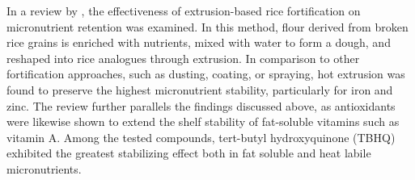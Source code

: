 In a review by \citet{saha}, the effectiveness of extrusion-based rice fortification on
 micronutrient retention was examined. In this method, flour derived from broken rice grains is
 enriched with nutrients, mixed with water to form a dough, and reshaped into rice analogues
 through extrusion. In comparison to other fortification approaches, such as dusting, coating, or 
 spraying, hot extrusion was found to preserve the highest micronutrient stability, particularly 
 for iron and zinc. The review further parallels the findings discussed above, as antioxidants 
 were likewise shown to extend the shelf stability of fat-soluble vitamins such as vitamin A. 
 Among the tested compounds, tert-butyl hydroxyquinone (TBHQ) exhibited the greatest stabilizing 
 effect both in fat soluble and heat labile micronutrients.
